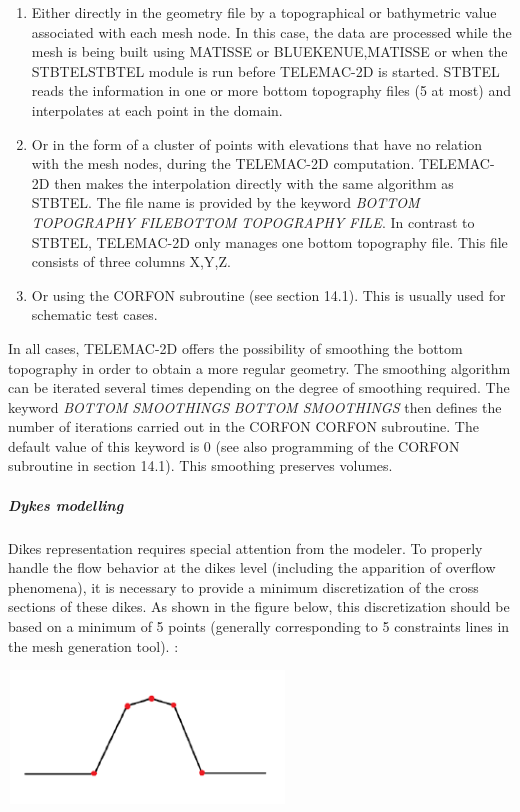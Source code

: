 \begin{enumerate}
\item  Either directly in the geometry file by a topographical or bathymetric value associated with each mesh node. In this case, the data are processed while the mesh is being built using MATISSE or BLUEKENUE,MATISSE or when the STBTELSTBTEL module is run before TELEMAC-2D is started. STBTEL reads the information in one or more bottom topography files (5 at most) and interpolates at each point in the domain.

\item  Or in the form of a cluster of points with elevations that have no relation with the mesh nodes, during the TELEMAC-2D computation. TELEMAC-2D then makes the interpolation directly with the same algorithm as STBTEL. The file name is provided by the keyword \textit{BOTTOM TOPOGRAPHY FILEBOTTOM TOPOGRAPHY FILE}. In contrast to STBTEL, TELEMAC-2D only manages one bottom topography file. This file consists of three columns X,Y,Z.

\item  Or using the CORFON subroutine (see section 14.1). This is usually used for schematic test cases.
\end{enumerate}

 In all cases, TELEMAC-2D offers the possibility of smoothing the bottom topography in order to obtain a more regular geometry. The smoothing algorithm can be iterated several times depending on the degree of smoothing required. The keyword \textit{BOTTOM SMOOTHINGS} \textit{BOTTOM SMOOTHINGS} then defines the number of iterations carried out in the CORFON CORFON subroutine. The default value of this keyword is 0 (see also programming of the CORFON subroutine in section 14.1). This smoothing preserves volumes.


\subparagraph{ Dykes modelling}

 Dikes representation requires special attention from the modeler. To properly handle the flow behavior at the dikes level (including the apparition of overflow phenomena), it is necessary to provide a minimum discretization of the cross sections of these dikes. As shown in the figure below, this discretization should be based on a minimum of 5 points (generally corresponding to 5 constraints lines in the mesh generation tool). :

 \includegraphics*[width=2.91in, height=1.39in, keepaspectratio=false]{./graphics/dyke.png}

